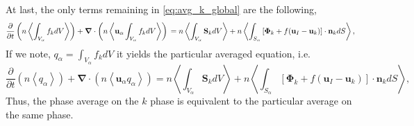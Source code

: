 \documentclass[twocolumn]{My_article}
\newcommand{\pavg}[1]{n \left<#1\right>}
\newcommand{\nablab}{\bm{\nabla}}
\newcommand{\pddt}{\frac{\partial}{\partial t}}
\begin{document}
At last, the only terms remaining in \ref{eq:avg_k_global} are the following,
\begin{equation*}
    \pddt   \left(\pavg{\int_{V_\alpha} f_k dV}\right)
    + \nablab \cdot \left(\pavg{\textbf{u}_\alpha \int_{V_\alpha} f_k  dV  }\right)\\
    = \pavg{\int_{V_\alpha} \textbf{S}_k dV }
    + \pavg{\int_{S_\alpha} \left[\bm{\Phi}_k
    + f (\textbf{u}_I-\textbf{u}_k) \right] \cdot \textbf{n}_k d S},
\end{equation*}
If we note, $q_\alpha = \int_{V_\alpha} f_k dV$ it yields the particular averaged equation, i.e.
\begin{equation}
    \pddt   \left(\pavg{q_\alpha}\right)
    + \nablab \cdot \left(\pavg{\textbf{u}_\alpha q_\alpha  }\right)
    = \pavg{\int_{V_\alpha} \textbf{S}_k dV }
    + \pavg{\int_{S_\alpha} \left[\bm{\Phi}_k
    + f (\textbf{u}_I-\textbf{u}_k) \right] \cdot \textbf{n}_k d S},
\end{equation}
Thus, the phase average on the $k$ phase is equivalent to the particular average on the same phase.
\end{document}
